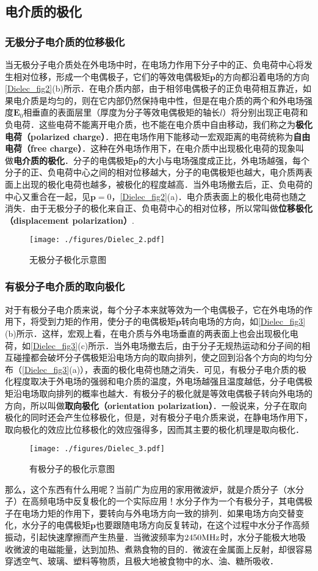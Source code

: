 \subsection{电介质的极化}

\subsubsection{无极分子电介质的位移极化}

当无极分子电介质处在外电场中时，在电场力作用下分子中的正、负电荷中心将发生相对位移，形成一个电偶极子，它们的等效电偶极矩$\mathbf p$的方向都沿着电场的方向\autoref{Dielec_fig2}(b)所示．在电介质内部，由于相邻电偶极子的正负电荷相互靠近，如果电介质是均匀的，则在它内部仍然保持电中性，但是在电介质的两个和外电场强度$\mathbf E_0$相垂直的表面层里（厚度为分子等效电偶极矩的轴长$l$）将分别出现正电荷和负电荷．这些电荷不能离开电介质，也不能在电介质中自由移动，我们称之为\textbf{极化电荷（polarized charge）}．把在电场作用下能移动一宏观距离的电荷统称为\textbf{自由电荷（free charge）}．这种在外电场作用下，在电介质中出现极化电荷的现象叫做\textbf{电介质的极化}．分子的电偶极矩$\mathbf p $的大小与电场强度成正比，外电场越强，每个分子的正、负电荷中心之间的相对位移越大，分子的电偶极矩也越大，电介质两表面上出现的极化电荷也越多，被极化的程度越高．当外电场撤去后，正、负电荷的中心又重合在一起，见$\mathbf p=0$，\autoref{Dielec_fig2}(a)．电介质表面上的极化电荷也随之消失．由于无极分子的极化来自正、负电荷中心的相对位移，所以常叫做\textbf{位移极化（displacement polarization）}.
\begin{figure}[ht]
\centering
\texttt{[image: ./figures/Dielec\_2.pdf]}
\caption{无极分子极化示意图} \label{Dielec_fig2}
\end{figure}

\subsubsection{有极分子电介质的取向极化}

对于有极分子电介质来说，每个分子本来就等效为一个电偶极子，它在外电场的作用下，将受到力矩的作用，使分子的电偶极矩$\mathbf p$转向电场的方向，如\autoref{Dielec_fig3}(b)所示．这样，宏观上看，在电介质与外电场垂直的两表面上也会出现极化电荷，如\autoref{Dielec_fig3}(c)所示．当外电场撤去后，由于分子无规热运动和分子间的相互碰撞都会破坏分子偶极矩沿电场方向的取向排列，使之回到沿各个方向的均匀分布（\autoref{Dielec_fig3}(a)），表面的极化电荷也随之消失．可见，有极分子电介质的极化程度取决于外电场的强弱和电介质的温度，外电场越强且温度越低，分子电偶极矩沿电场取向排列的概率也越大．有极分子的极化就是等效电偶极子转向外电场的方向，所以叫做\textbf{取向极化（orientation polarization）}．一般说来，分子在取向极化的同时还会产生位移极化，但是，对有极分子电介质来说，在静电场作用下，取向极化的效应比位移极化的效应强得多，因而其主要的极化机理是取向极化．
\begin{figure}[ht]
\centering
\texttt{[image: ./figures/Dielec\_3.pdf]}
\caption{有极分子的极化示意图} \label{Dielec_fig3}
\end{figure}

那么，这个东西有什么用呢？当前广为应用的家用微波炉，就是介质分子（水分子）在高频电场中反复极化的一个实际应用！水分子作为一个有极分子，其电偶极子在电场力矩的作用下，要转向与外电场方向一致的排列．如果电场方向交替变化，水分子的电偶极矩$\mathbf p$也要跟随电场方向反复转动，在这个过程中水分子作高频振动，引起快速摩擦而产生热量．当微波频率为$2450\rm  MHz$时，水分子能极大地吸收微波的电磁能量，达到加热、煮熟食物的目的．微波在金属面上反射，却很容易穿透空气、玻璃、塑料等物质，且极大地被食物中的水、油、糖所吸收．
